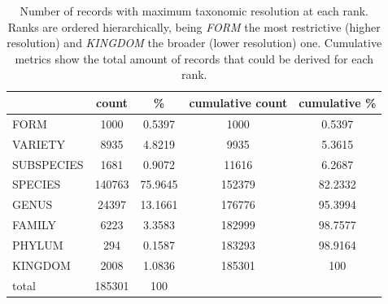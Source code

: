 \begin{table}[H]
  \caption{Number of records with maximum taxonomic resolution at each rank. Ranks are ordered hierarchically, being \textit{FORM} the most restrictive (higher resolution) and \textit{KINGDOM} the broader (lower resolution) one. Cumulative metrics show the total amount of records that could be derived for each rank.}
  \begin{center}
  \begin{tabular}{l c c c c}
       & count & \% & cumulative count & cumulative \% \\
      \hline
      FORM & 1000 & 0.5397 & 1000 & 0.5397\\
      VARIETY & 8935 & 4.8219 & 9935 & 5.3615\\
      SUBSPECIES & 1681 & 0.9072 & 11616 & 6.2687\\
      SPECIES & 140763 & 75.9645 & 152379 & 82.2332\\
      GENUS & 24397 & 13.1661 & 176776 & 95.3994\\
      FAMILY & 6223 & 3.3583 & 182999 & 98.7577\\
      PHYLUM & 294 & 0.1587 & 183293 & 98.9164\\
      KINGDOM & 2008 & 1.0836 & 185301 & 100\\
      \hline
      total & 185301 & 100 & &
  \end{tabular}
  \end{center}
  \label{table:dset_taxonomicres_counts}
\end{table}



